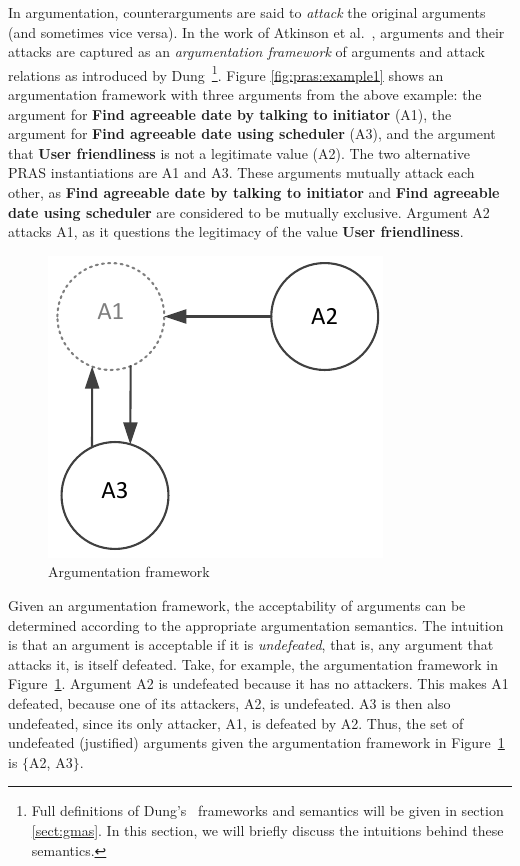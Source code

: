 \documentclass[11.5pt,two column]{llncs}
\begin{document}
In argumentation, counterarguments are said to \emph{attack} the original arguments (and sometimes vice versa). In the work of Atkinson et al.~\cite{atkinson2007}, arguments and their attacks are captured as an \emph{argumentation framework} of arguments and attack relations as introduced by Dung~\cite{Dung1995}\footnote{Full definitions of Dung's~\cite{Dung1995} frameworks and semantics will be given in section \ref{sect:gmas}. In this section, we will briefly discuss the intuitions behind these semantics.}. Figure \ref{fig:pras:example1} shows an argumentation framework with three arguments from the above example: the argument for \textbf{Find agreeable date by talking to initiator} (A1), the argument for \textbf{Find agreeable date using scheduler} (A3), and the argument that \textbf{User friendliness} is not a legitimate value (A2). The two alternative PRAS instantiations are A1 and A3. These arguments mutually attack each other, as \textbf{Find agreeable date by talking to initiator}  and \textbf{Find agreeable date using scheduler} are considered to be mutually exclusive. Argument A2 attacks A1, as it questions the legitimacy of the value \textbf{User friendliness}. 

\begin{figure}[ht]
\centering
\includegraphics[scale=0.8]{img/Fig1}
\caption{Argumentation framework}
\label{fig:pras:example}
\end{figure}

Given an argumentation framework, the acceptability of arguments can be determined according to the appropriate argumentation semantics. The intuition is that an argument is acceptable if it is \emph{undefeated}, that is, any argument that attacks it, is itself defeated. Take, for example, the argumentation framework in Figure~\ref{fig:pras:example}. Argument A2 is undefeated because it has no attackers. This makes A1 defeated, because one of its attackers, A2, is undefeated. A3 is then also undefeated, since its only attacker, A1, is defeated by A2. Thus, the set of undefeated (justified) arguments given the argumentation framework in Figure~\ref{fig:pras:example} is $\{$A2, A3$\}$. 
\end{document}

